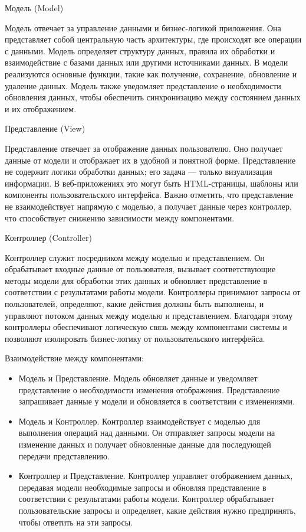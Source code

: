 Модель (Model)

Модель отвечает за управление данными и бизнес-логикой приложения. Она представляет собой центральную часть архитектуры, где происходят все операции с данными. Модель определяет структуру данных, правила их обработки и взаимодействие с базами данных или другими источниками данных. В модели реализуются основные функции, такие как получение, сохранение, обновление и удаление данных. Модель также уведомляет представление о необходимости обновления данных, чтобы обеспечить синхронизацию между состоянием данных и их отображением.

Представление (View)

Представление отвечает за отображение данных пользователю. Оно получает данные от модели и отображает их в удобной и понятной форме. Представление не содержит логики обработки данных; его задача — только визуализация информации. В веб-приложениях это могут быть HTML-страницы, шаблоны или компоненты пользовательского интерфейса. Важно отметить, что представление не взаимодействует напрямую с моделью, а получает данные через контроллер, что способствует снижению зависимости между компонентами.

Контроллер (Controller)

Контроллер служит посредником между моделью и представлением. Он обрабатывает входные данные от пользователя, вызывает соответствующие методы модели для обработки этих данных и обновляет представление в соответствии с результатами работы модели. Контроллеры принимают запросы от пользователей, определяют, какие действия должны быть выполнены, и управляют потоком данных между моделью и представлением. Благодаря этому контроллеры обеспечивают логическую связь между компонентами системы и позволяют изолировать бизнес-логику от пользовательского интерфейса.

Взаимодействие между компонентами:

\begin{itemize}
	\item Модель и Представление. Модель обновляет данные и уведомляет представление о необходимости изменения отображения. Представление запрашивает данные у модели и обновляется в соответствии с изменениями.
	\item Модель и Контроллер. Контроллер взаимодействует с моделью для выполнения операций над данными. Он отправляет запросы модели на изменение данных и получает обновленные данные для последующей передачи представлению.
	\item Контроллер и Представление. Контроллер управляет отображением данных, передавая модели необходимые запросы и обновляя представление в соответствии с результатами работы модели. Контроллер обрабатывает пользовательские запросы и определяет, какие действия нужно предпринять, чтобы ответить на эти запросы.
\end{itemize}

